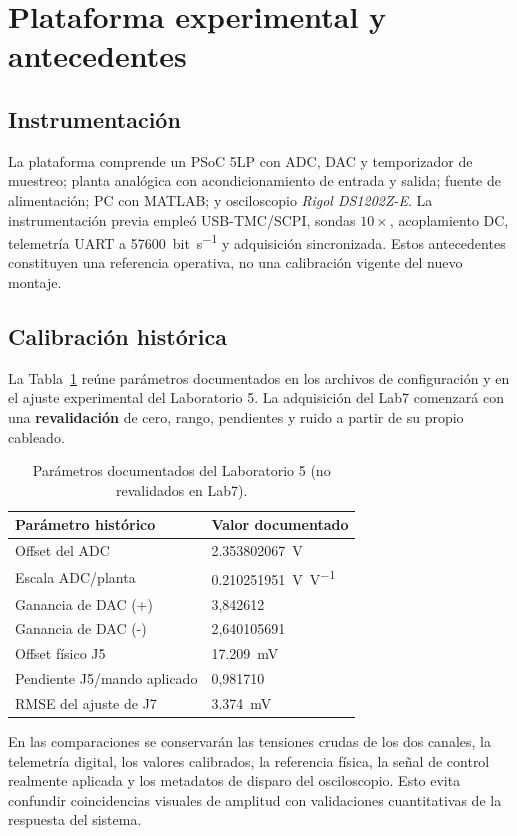 \section{Plataforma experimental y antecedentes}
\subsection{Instrumentación}
La plataforma comprende un PSoC 5LP con ADC, DAC y temporizador de muestreo;
planta analógica con acondicionamiento de entrada y salida; fuente de
alimentación; PC con MATLAB; y osciloscopio \emph{Rigol DS1202Z-E}.
La instrumentación previa empleó USB-TMC/SCPI, sondas \(10\times\),
acoplamiento DC, telemetría UART a \SI{57600}{bit\per\second} y adquisición
sincronizada. Estos antecedentes constituyen una referencia operativa, no una
calibración vigente del nuevo montaje.

\subsection{Calibración histórica}
La Tabla~\ref{tab:calib_historica} reúne parámetros documentados en los
archivos de configuración y en el ajuste experimental del Laboratorio 5.
La adquisición del Lab7 comenzará con una \textbf{revalidación} de cero, rango,
pendientes y ruido a partir de su propio cableado.

\begin{table}[t]
\centering
\caption{Parámetros documentados del Laboratorio 5 (no revalidados en Lab7).}
\label{tab:calib_historica}
\small
\begin{tabular}{@{}ll@{}}
\toprule
Parámetro histórico & Valor documentado \\
\midrule
Offset del ADC & \SI{2.353802067}{\volt} \\
Escala ADC/planta & \SI{0.210251951}{\volt\per\volt} \\
Ganancia de DAC (+) & 3,842612 \\
Ganancia de DAC (-) & 2,640105691 \\
Offset físico J5 & \SI{17.209}{\milli\volt} \\
Pendiente J5/mando aplicado & 0,981710 \\
RMSE del ajuste de J7 & \SI{3.374}{\milli\volt} \\
\bottomrule
\end{tabular}
\end{table}

En las comparaciones se conservarán las tensiones crudas de los dos canales,
la telemetría digital, los valores calibrados, la referencia física, la
señal de control realmente aplicada y los metadatos de disparo del osciloscopio.
Esto evita confundir coincidencias visuales de amplitud con validaciones
cuantitativas de la respuesta del sistema.
